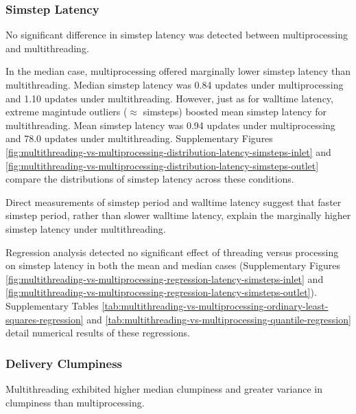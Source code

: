 \subsubsection{Simstep Latency}

No significant difference in simstep latency was detected between multiprocessing and multithreading.

In the median case, multiprocessing offered marginally lower simstep latency than multithreading.
Median simstep latency was 0.84 updates under multiprocessing and 1.10 updates under multithreading.
However, just as for walltime latency, extreme magintude outliers ($\approx$  simsteps) boosted mean simstep latency for multithreading.
Mean simstep latency was 0.94 updates under multiprocessing and 78.0 updates under multithreading.
Supplementary Figures \ref{fig:multithreading-vs-multiprocessing-distribution-latency-simsteps-inlet} and \ref{fig:multithreading-vs-multiprocessing-distribution-latency-simsteps-outlet} compare the distributions of simstep latency across these conditions.

Direct measurements of simstep period and walltime latency suggest that faster simstep period, rather than slower walltime latency, explain the marginally higher simstep latency under multithreading.

Regression analysis detected no significant effect of threading versus processing on simstep latency in both the mean and median cases (Supplementary Figures \ref{fig:multithreading-vs-multiprocessing-regression-latency-simsteps-inlet} and \ref{fig:multithreading-vs-multiprocessing-regression-latency-simsteps-outlet}).
Supplementary Tables \ref{tab:multithreading-vs-multiprocessing-ordinary-least-squares-regression} and \ref{tab:multithreading-vs-multiprocessing-quantile-regression} detail numerical results of these regressions.

\subsubsection{Delivery Clumpiness}

Multithreading exhibited higher median clumpiness and greater variance in clumpiness than multiprocessing.

